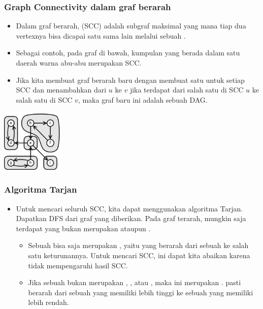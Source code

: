 \begin{frame}
\frametitle{Graph Connectivity dalam graf berarah}
\begin{itemize}
  \item Dalam graf berarah,  (SCC) adalah subgraf maksimal yang mana tiap dua vertexnya bisa dicapai satu sama lain melalui sebuah \fpath.
  \item Sebagai contoh, pada graf di bawah, kumpulan \fnode yang berada dalam satu daerah warna abu-abu merupakan SCC.
  \item Jika kita membuat graf berarah baru dengan membuat satu \fnode untuk setiap SCC dan menambahkan \fedge dari \fnode $u$ ke \fnode $v$ jika terdapat \fedge dari salah satu \fnode di SCC $u$ ke salah satu \fnode di SCC $v$, maka graf baru ini adalah sebuah DAG.
\end{itemize}
\begin{center}
\includegraphics[width=3cm]{asset/scc.png}
\end{center}
\end{frame}

\begin{frame}
\frametitle{Algoritma Tarjan}
\begin{itemize}
  \item Untuk mencari seluruh SCC, kita dapat menggunakan algoritma Tarjan. Dapatkan DFS \ftree dari graf yang diberikan. Pada graf terarah, mungkin saja terdapat \fedge yang bukan merupakan \ftreeedge ataupun \fbackedge.
  \begin{itemize}
    \item Sebuah \fedge bisa saja merupakan , yaitu \fedge yang berarah dari sebuah \fnode ke salah satu keturunannya. Untuk mencari SCC, \fedge ini dapat kita abaikan karena tidak mempengaruhi hasil SCC.
    \item Jika sebuah \fedge bukan merupakan \ftreeedge, \fbackedge, atau \fforwardedge, maka \fedge ini merupakan . \fCrossedge pasti berarah dari sebuah \fnode yang memiliki \fdiscoverytime lebih tinggi ke sebuah \fnode yang memiliki \fdiscoverytime lebih rendah.
  \end{itemize}
\end{itemize}
\end{frame}

